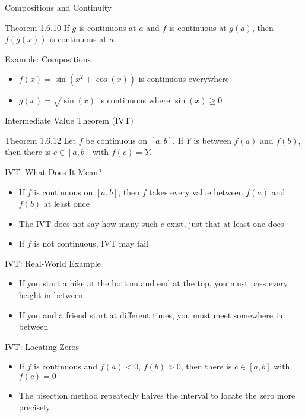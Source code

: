 \documentclass[aspectratio=169]{beamer}
\begin{document}
\begin{frame}{Compositions and Continuity}
\begin{block}{Theorem 1.6.10}
If $g$ is continuous at $a$ and $f$ is continuous at $g(a)$, then $f(g(x))$ is continuous at $a$.
\end{block}
\end{frame}

\begin{frame}{Example: Compositions}
\begin{itemize}
  \item $f(x) = \sin(x^2+\cos(x))$ is continuous everywhere
  \item $g(x) = \sqrt{\sin(x)}$ is continuous where $\sin(x) \geq 0$
\end{itemize}
\end{frame}

\begin{frame}{Intermediate Value Theorem (IVT)}
\begin{block}{Theorem 1.6.12}
Let $f$ be continuous on $[a,b]$. If $Y$ is between $f(a)$ and $f(b)$, then there is $c \in [a,b]$ with $f(c) = Y$.
\end{block}
\end{frame}

\begin{frame}{IVT: What Does It Mean?}
\begin{itemize}
  \item If $f$ is continuous on $[a,b]$, then $f$ takes every value between $f(a)$ and $f(b)$ at least once
  \item The IVT does not say how many such $c$ exist, just that at least one does
  \item If $f$ is not continuous, IVT may fail
\end{itemize}
\end{frame}

\begin{frame}{IVT: Real-World Example}
\begin{itemize}
  \item If you start a hike at the bottom and end at the top, you must pass every height in between
  \item If you and a friend start at different times, you must meet somewhere in between
\end{itemize}
\end{frame}

\begin{frame}{IVT: Locating Zeros}
\begin{itemize}
  \item If $f$ is continuous and $f(a)<0$, $f(b)>0$, then there is $c \in [a,b]$ with $f(c)=0$
  \item The bisection method repeatedly halves the interval to locate the zero more precisely
\end{itemize}
\end{frame}
\end{document}
